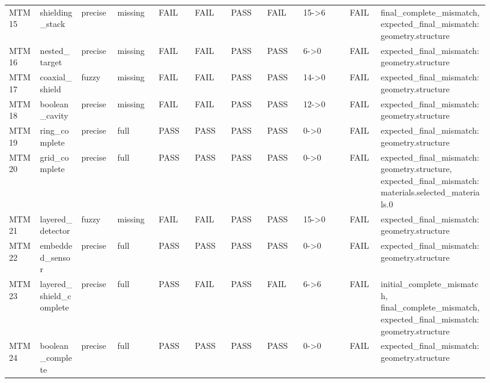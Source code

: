 \documentclass[11pt]{ctexart}
\begin{document}
\begin{longtable}{p{0.06\linewidth}p{0.08\linewidth}p{0.07\linewidth}p{0.08\linewidth}p{0.07\linewidth}p{0.07\linewidth}p{0.07\linewidth}p{0.07\linewidth}p{0.09\linewidth}p{0.06\linewidth}p{0.21\linewidth}}
MTM15 & shielding\_stack & precise & missing & FAIL & FAIL & PASS & FAIL & 15->6 & FAIL & final\_complete\_mismatch, expected\_final\_mismatch:geometry.structure \\
MTM16 & nested\_target & precise & missing & FAIL & FAIL & PASS & PASS & 6->0 & FAIL & expected\_final\_mismatch:geometry.structure \\
MTM17 & coaxial\_shield & fuzzy & missing & FAIL & FAIL & PASS & PASS & 14->0 & FAIL & expected\_final\_mismatch:geometry.structure \\
MTM18 & boolean\_cavity & precise & missing & FAIL & FAIL & PASS & PASS & 12->0 & FAIL & expected\_final\_mismatch:geometry.structure \\
MTM19 & ring\_complete & precise & full & PASS & PASS & PASS & PASS & 0->0 & FAIL & expected\_final\_mismatch:geometry.structure \\
MTM20 & grid\_complete & precise & full & PASS & PASS & PASS & PASS & 0->0 & FAIL & expected\_final\_mismatch:geometry.structure, expected\_final\_mismatch:materials.selected\_materials.0 \\
MTM21 & layered\_detector & fuzzy & missing & FAIL & FAIL & PASS & PASS & 15->0 & FAIL & expected\_final\_mismatch:geometry.structure \\
MTM22 & embedded\_sensor & precise & full & PASS & PASS & PASS & PASS & 0->0 & FAIL & expected\_final\_mismatch:geometry.structure \\
MTM23 & layered\_shield\_complete & precise & full & PASS & FAIL & PASS & FAIL & 6->6 & FAIL & initial\_complete\_mismatch, final\_complete\_mismatch, expected\_final\_mismatch:geometry.structure \\
MTM24 & boolean\_complete & precise & full & PASS & PASS & PASS & PASS & 0->0 & FAIL & expected\_final\_mismatch:geometry.structure \\
\bottomrule
\end{longtable}
\end{document}
